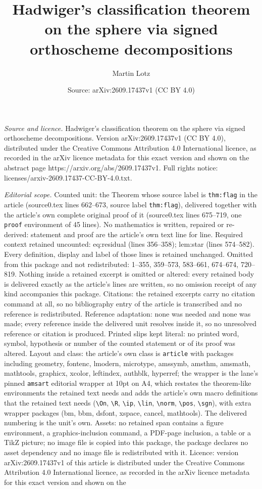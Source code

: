 \documentclass[10pt,a4paper]{amsart}
\title[Hadwiger's classification theorem on the sphere via signed o]{Hadwiger's classification theorem on the sphere via signed orthoscheme decompositions}
\author{Martin Lotz}
\date{Source: arXiv:2609.17437v1 (CC BY 4.0)}
\begin{document}
\maketitle

\noindent\emph{Source and licence.} Hadwiger's classification theorem on the sphere via signed orthoscheme decompositions. Version arXiv:2609.17437v1 (CC BY 4.0), distributed under the Creative Commons Attribution 4.0 International licence, as recorded in the arXiv licence metadata for this exact version and shown on the abstract page https://arxiv.org/abs/2609.17437v1. Full rights notice: licenses/arxiv-2609.17437-CC-BY-4.0.txt.\par\smallskip

\noindent\textit{Editorial scope.} Counted unit: the Theorem whose source label is \texttt{thm:flag} in the article (source0.tex lines 662--673, source label \texttt{thm:flag}), delivered together with the article's own complete original proof of it (source0.tex lines 675--719, one \texttt{proof} environment of 45 lines). No mathematics is written, repaired or re-derived: statement and proof are the article's own text line for line. Required context retained uncounted: eq:residual (lines 356--358); lem:star (lines 574--582). Every definition, display and label of those lines is retained unchanged. Omitted from this package and not redistributed: 1--355, 359--573, 583--661, 674--674, 720--819. Nothing inside a retained excerpt is omitted or altered: every retained body is delivered exactly as the article's lines are written, so no omission receipt of any kind accompanies this package. Citations: the retained excerpts carry no citation command at all, so no bibliography entry of the article is transcribed and no reference is redistributed. Reference adaptation: none was needed and none was made; every reference inside the delivered unit resolves inside it, so no unresolved reference or citation is produced. Printed slips kept literal: no printed word, symbol, hypothesis or number of the counted statement or of its proof was altered. Layout and class: the article's own class is \texttt{article} with packages including geometry, fontenc, lmodern, microtype, amssymb, amsthm, amsmath, mathtools, graphicx, xcolor, leftindex, authblk, hyperref; the wrapper is the lane's pinned \texttt{amsart} editorial wrapper at 10pt on A4, which restates the theorem-like environments the retained text needs and adds the article's own macro definitions that the retained text needs (\texttt{\textbackslash On}, \texttt{\textbackslash R}, \texttt{\textbackslash ip}, \texttt{\textbackslash lin}, \texttt{\textbackslash norm}, \texttt{\textbackslash pos}, \texttt{\textbackslash sgn}), with extra wrapper packages (bm, bbm, dsfont, xspace, cancel, mathtools). The delivered numbering is the unit's own. Assets: no retained span contains a figure environment, a graphics-inclusion command, a PDF-page inclusion, a table or a TikZ picture; no image file is copied into this package, the package declares no asset dependency and no image file is redistributed with it. Licence: version arXiv:2609.17437v1 of this article is distributed under the Creative Commons Attribution 4.0 International licence, as recorded in the arXiv licence metadata for this exact version and shown on the 
\end{document}
